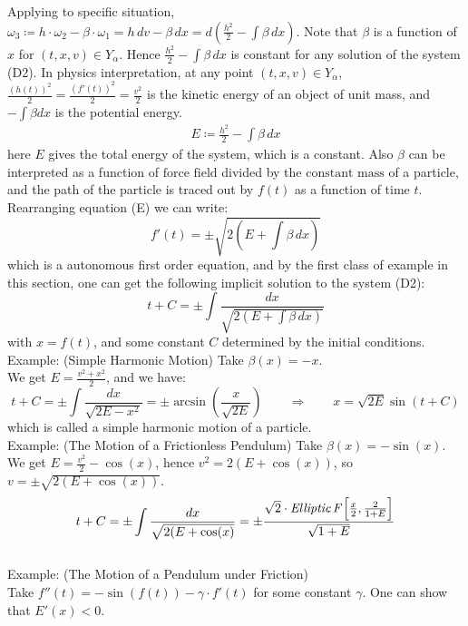 \documentclass[11pt,oneside]{book}
\theoremstyle{break}
\theoremstyle{break}
\newcommand{\example}{\color{green}Example: \color{black}}
\begin{document}
\begin{enumerate}
Applying to specific situation, $\omega_3 \coloneqq h\cdot\omega_2 - \beta\cdot \omega_1 = h\,dv - \beta \, dx = d(\frac{h^2}{2} - \int \beta \, dx)$. Note that $\beta$ is a function of $x$ for $(t,x,v) \in Y_{\alpha}$. Hence $\frac{h^2}{2} - \int \beta \, dx$ is constant for any solution of the system (D2). In physics interpretation, at any point $(t,x,v) \in Y_{\alpha}$, $\frac{(h(t))^2}{2} =\frac{(f'(t))^2}{2} =  \frac{v^2}{2}$ is the kinetic energy of an object of unit mass, and $-\int \beta dx$ is the potential energy. 
\begin{align*}
E \coloneqq \frac{h^2}{2} - \int \beta \, dx
\tag{E}
\end{align*}
here $E$ gives the total energy of the system, which is a constant. Also $\beta$ can be interpreted as a function of $\text{force field}$ divided by the ${\text{constant mass}}$ of a particle, and the path of the particle is traced out by $f(t)$ as a function of time $t$. Rearranging equation (E) we can write:
$$f'(t) = \pm \sqrt{2\left(E+\int \beta\, dx\right)} $$
which is a autonomous first order equation, and by the first class of example in this section, one can get the following implicit solution to the system (D2):
$$t+C = \pm \int \frac{dx}{\sqrt{2(E+\int \beta \, dx)}}$$
with $x = f(t)$, and some constant $C$ determined by the initial conditions. \\

\example (Simple Harmonic Motion) Take $\beta(x) = -x$. \\
We get $E = \frac{v^2 + x^2}{2}$, and we have: $$t+C = \pm \int \frac{dx}{\sqrt{2E-x^2}} = \pm \arcsin\left(\frac{x}{\sqrt{2E}}\right) \qquad\Rightarrow\qquad x = \sqrt{2E} \sin(t+C)$$ which is called a simple harmonic motion of a particle. \\

\example (The Motion of a Frictionless Pendulum) Take $\beta(x) = -\sin(x)$. 
\\We get $E = \frac{v^2}{2}-\cos(x)$, hence $v^2 = 2(E+\cos(x))$, so $v = \pm \sqrt{2(E+\cos(x))}$.
$$t+C = \pm \int \frac{dx}{\sqrt{2(E+\cos(x)}} = \pm \frac{\sqrt{2}\cdot  \textit{Elliptic\,F}\left[ \frac{x}{2}, \frac{2}{1+E}\right]}{\sqrt{1+E}}$$\\

\example (The Motion of a Pendulum under Friction) \\Take $f''(t) = -\sin(f(t)) -\gamma \cdot f'(t)$ for some constant $\gamma$. One can show that $E'(x) <0$. 
\end{enumerate}
\end{document}
